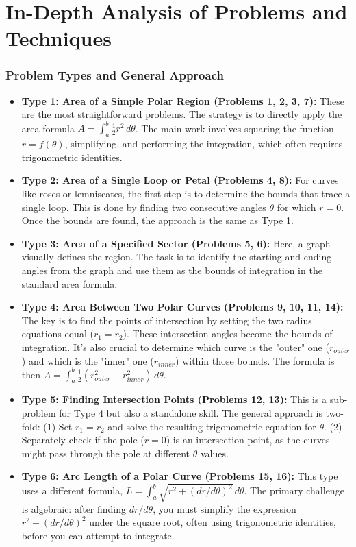 \documentclass{article}
\begin{document}
\part{In-Depth Analysis of Problems and Techniques}
\section{Problem Types and General Approach}
\begin{itemize}
    \item \textbf{Type 1: Area of a Simple Polar Region (Problems 1, 2, 3, 7):} These are the most straightforward problems. The strategy is to directly apply the area formula $A = \int_{a}^{b} \frac{1}{2} r^2 \,d\theta$. The main work involves squaring the function $r=f(\theta)$, simplifying, and performing the integration, which often requires trigonometric identities.
    \item \textbf{Type 2: Area of a Single Loop or Petal (Problems 4, 8):} For curves like roses or lemniscates, the first step is to determine the bounds that trace a single loop. This is done by finding two consecutive angles $\theta$ for which $r=0$. Once the bounds are found, the approach is the same as Type 1.
    \item \textbf{Type 3: Area of a Specified Sector (Problems 5, 6):} Here, a graph visually defines the region. The task is to identify the starting and ending angles from the graph and use them as the bounds of integration in the standard area formula.
    \item \textbf{Type 4: Area Between Two Polar Curves (Problems 9, 10, 11, 14):} The key is to find the points of intersection by setting the two radius equations equal ($r_1=r_2$). These intersection angles become the bounds of integration. It's also crucial to determine which curve is the "outer" one ($r_{outer}$) and which is the "inner" one ($r_{inner}$) within those bounds. The formula is then $A = \int_{a}^{b} \frac{1}{2} (r_{outer}^2 - r_{inner}^2) \,d\theta$.
    \item \textbf{Type 5: Finding Intersection Points (Problems 12, 13):} This is a sub-problem for Type 4 but also a standalone skill. The general approach is two-fold: (1) Set $r_1=r_2$ and solve the resulting trigonometric equation for $\theta$. (2) Separately check if the pole ($r=0$) is an intersection point, as the curves might pass through the pole at different $\theta$ values.
    \item \textbf{Type 6: Arc Length of a Polar Curve (Problems 15, 16):} This type uses a different formula, $L = \int_{a}^{b} \sqrt{r^2 + (dr/d\theta)^2} \,d\theta$. The primary challenge is algebraic: after finding $dr/d\theta$, you must simplify the expression $r^2 + (dr/d\theta)^2$ under the square root, often using trigonometric identities, before you can attempt to integrate.

\end{itemize}
\end{document}
